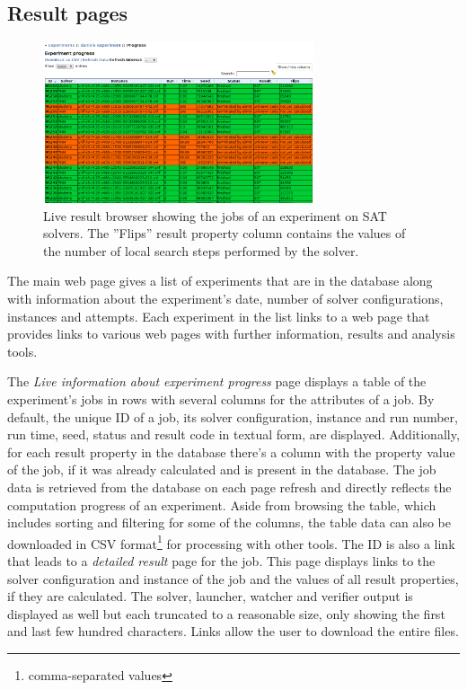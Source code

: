 \subsection{Result pages}
\begin{figure}
\centering
\includegraphics[width=8cm]{progress_table.png}
\caption{Live result browser showing the jobs of an experiment on SAT solvers. The ''Flips'' result property column contains the values of the number of local search steps performed by the solver.}
\label{fig:progress_table}
\end{figure}
The main web page gives a list of experiments that are in the database along with information about the experiment's date, number of solver configurations, instances and attempts.
Each experiment in the list links to a web page that provides links to various web pages with further information, results and analysis tools.

The \emph{Live information about experiment progress} page displays a table of the experiment's jobs in rows with several columns for the attributes of a job.
By default, the unique ID of a job, its solver configuration, instance and run number, run time, seed, status and result code in textual form, are displayed.
Additionally, for each result property in the database there's a column with the property value of the job, if it was already calculated and is present in the database.
The job data is retrieved from the database on each page refresh and directly reflects the computation progress of an experiment.
Aside from browsing the table, which includes sorting and filtering for some of the columns, the table data can also be downloaded in CSV format\footnote{comma-separated values} for
processing with other tools.
The ID is also a link that leads to a \emph{detailed result} page for the job. This page displays links to the solver configuration and instance of the job and the values of all result properties, if they are calculated. The solver, launcher, watcher and verifier output is displayed as well but each truncated to a reasonable size, only showing the first and last few hundred
characters. Links allow the user to download the entire files.


